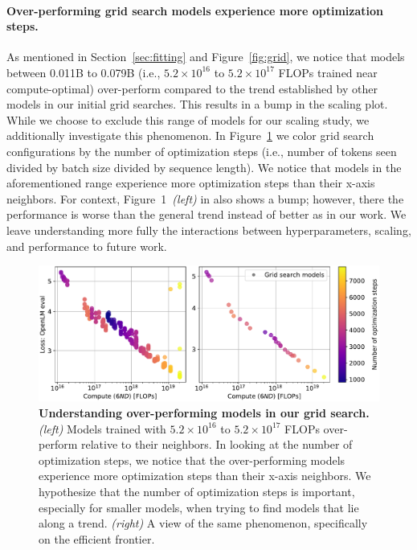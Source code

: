 \begin{appendix}
\paragraph{Over-performing grid search models experience more optimization steps.}
As mentioned in Section~\ref{sec:fitting} and Figure~\ref{fig:grid}, we notice that models between 0.011B to 0.079B (i.e., $5.2 \times 10^{16}$ to $5.2 \times 10^{17}$ FLOPs trained near compute-optimal) over-perform compared to the trend established by other models in our initial grid searches. This results in a bump in the scaling plot.
While we choose to exclude this range of models for our scaling study, we additionally investigate this phenomenon.
In Figure~\ref{fig:grid_color} we color grid search configurations by the number of optimization steps (i.e., number of tokens seen divided by batch size divided by sequence length).
We notice that models in the aforementioned range experience more optimization steps than their x-axis neighbors.
For context, Figure~1~\emph{(left)} in \citet{kaplan2020scaling} also shows a bump; however, there the performance is worse than the general trend instead of better as in our work.
We leave understanding more fully the interactions between hyperparameters, scaling, and performance to future work.

\begin{figure}[tp]
    \centering
    \includegraphics[width=0.98\linewidth]{figs/grid_full_color.pdf}
    \caption{\textbf{Understanding over-performing models in our grid search.}
    \emph{(left)}
    Models trained with $5.2 \times 10^{16}$ to $5.2 \times 10^{17}$ FLOPs over-perform relative to their neighbors.
    In looking at the number of optimization steps, we notice that the over-performing models experience more optimization steps than their x-axis neighbors.
    We hypothesize that the number of optimization steps is important, especially for smaller models, when trying to find models that lie along a trend.
    \emph{(right)} A view of the same phenomenon, specifically on the efficient frontier. 
    }
    \label{fig:grid_color}
\end{figure}


\end{appendix}

